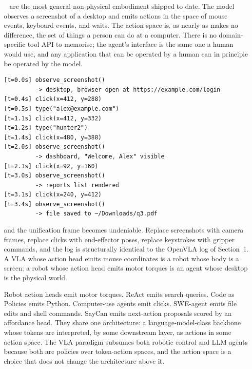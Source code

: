 ~\cite{Anthropic2024ComputerUse} are the most general non-physical embodiment shipped to date. The model observes a screenshot of a desktop and emits actions in the space of mouse events, keyboard events, and waits. The action space is, as nearly as makes no difference, the set of things a person can do at a computer. There is no domain-specific tool API to memorise; the agent's interface is the same one a human would use, and any application that can be operated by a human can in principle be operated by the model.

\begin{verbatim}
[t=0.0s] observe_screenshot()
         -> desktop, browser open at https://example.com/login
[t=0.4s] click(x=412, y=288)
[t=0.5s] type("alex@example.com")
[t=1.1s] click(x=412, y=332)
[t=1.2s] type("hunter2")
[t=1.4s] click(x=480, y=388)
[t=2.0s] observe_screenshot()
         -> dashboard, "Welcome, Alex" visible
[t=2.1s] click(x=92, y=160)
[t=3.0s] observe_screenshot()
         -> reports list rendered
[t=3.1s] click(x=240, y=412)
[t=3.4s] observe_screenshot()
         -> file saved to ~/Downloads/q3.pdf
\end{verbatim}


 and the unification frame becomes undeniable. Replace screenshots with camera frames, replace clicks with end-effector poses, replace keystrokes with gripper commands, and the log is structurally identical to the OpenVLA log of Section~1. A VLA whose action head emits mouse coordinates is a robot whose body is a screen; a robot whose action head emits motor torques is an agent whose desktop is the physical world.

\vspace{2.5em}

 Robot action heads emit motor torques. ReAct emits search queries. Code as Policies emits Python. Computer-use agents emit clicks. SWE-agent emits file edits and shell commands. SayCan emits next-action proposals scored by an affordance head. They share one architecture: a language-model-class backbone whose tokens are interpreted, by some downstream layer, as actions in some action space. The VLA paradigm subsumes both robotic control and LLM agents because both are policies over token-action spaces, and the action space is a choice that does not change the architecture above it.

